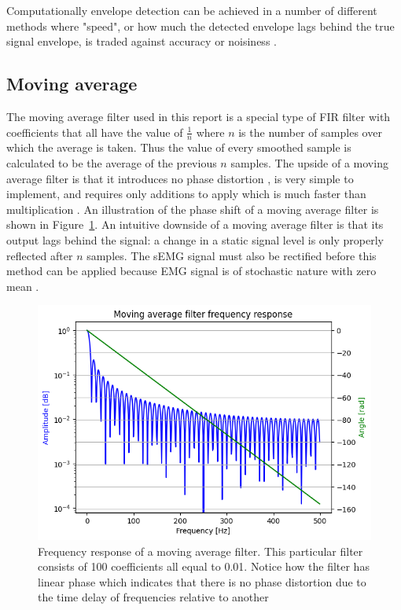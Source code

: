 Computationally envelope detection can be achieved in a number of different methods where "speed", or how much the detected envelope lags behind the true signal envelope, is traded against accuracy or noisiness \cite{dsp_good_bad_ugly}.

\subsection{Moving average}
The moving average filter used in this report is a special type of FIR filter with coefficients that all have the value of $\frac{1}{n}$ where $n$ is the number of samples over which the average is taken. Thus the value of every smoothed sample is calculated to be the average of the previous $n$ samples. The upside of a moving average filter is that it introduces no phase distortion \cite{fir_filter_properties}, is very simple to implement, and requires only additions to apply which is much faster than multiplication \cite{smith_moving_average_filters}. An illustration of the phase shift of a moving average filter is shown in Figure~\ref{fig:movingaverage_phaseshift}. An intuitive downside of a moving average filter is that its output lags behind the signal: a change in a static signal level is only properly reflected after $n$ samples. The sEMG signal must also be rectified before this method can be applied because EMG signal is of stochastic nature with zero mean \cite{rose2011electromyogram}.

\begin{figure}[h!t]
	\begin{center}
		\includegraphics[width=0.7\columnwidth]{images/movingaverage_phaseshift.png}
	\end{center}
	\caption{Frequency response of a moving average filter. This particular filter consists of 100 coefficients all equal to 0.01. Notice how the filter has linear phase which indicates that there is no phase distortion due to the time delay of frequencies relative to another \cite{fir_filter_properties}}
	\label{fig:movingaverage_phaseshift}
\end{figure}



